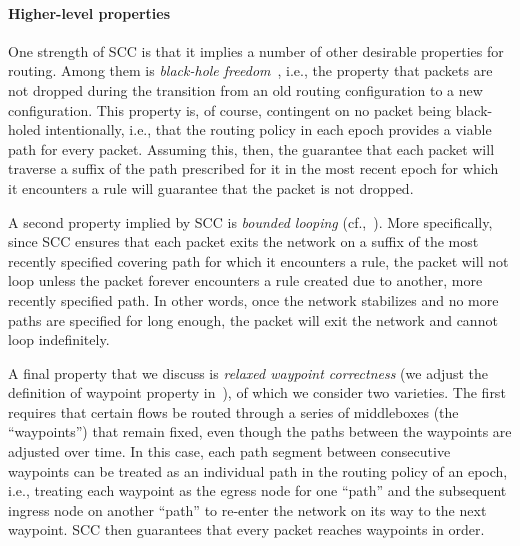 \paragraph{Higher-level properties}
One strength of SCC is that it implies a number of other desirable
properties for routing.  Among them is \textit{black-hole
  freedom}~\cite{ocusdn}, i.e., the property that packets are not dropped
during the transition from an old routing configuration to a new
configuration.  This property is, of course, contingent on no packet
being black-holed intentionally, i.e., that the routing policy in each
epoch provides a viable path for every packet.  Assuming this, then,
the guarantee that each packet will traverse a suffix of the path
prescribed for it in the most recent epoch for which it encounters a
rule will guarantee that the packet is not dropped.

A second property implied by SCC is \textit{bounded looping}
(cf.,~\cite{dibs}).  More specifically, since SCC ensures that each
packet exits the network on a suffix of the most recently specified
covering path for which it encounters a rule, the packet will not loop
unless the packet forever encounters a rule created due to another,
more recently specified path.  In other words, once the network
stabilizes and no more paths are specified for long enough, the packet
will exit the network and cannot loop indefinitely.

A final property that we discuss is \textit{relaxed waypoint correctness} (we adjust the definition of waypoint property in~\cite{simple,slick,opennf}), of
which we consider two varieties.  The first requires that certain
flows be routed through a series of middleboxes (the ``waypoints'')
that remain fixed, even though the paths between the waypoints are
adjusted over time.  In this case, each path segment
between consecutive waypoints can be treated as an individual path in
the routing policy of an epoch, i.e., treating each waypoint as the
egress node for one ``path'' and the subsequent ingress node on
another ``path'' to re-enter the network on its way to the next
waypoint.  SCC then guarantees that every packet reaches waypoints in
order.

